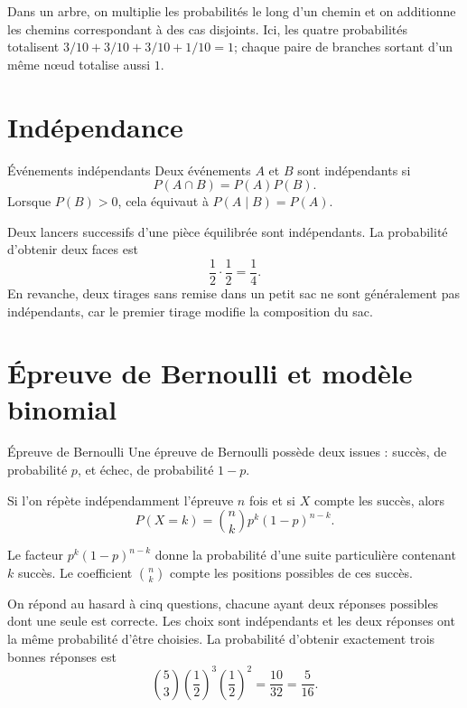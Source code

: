 Dans un arbre, on multiplie les probabilités le long d'un chemin et on additionne les chemins correspondant à des cas disjoints. Ici, les quatre probabilités totalisent \(3/10+3/10+3/10+1/10=1\); chaque paire de branches sortant d'un même nœud totalise aussi \(1\).

\section{Indépendance}
\label{manual:section:08.04}

\begin{definition}{Événements indépendants}{}
Deux événements $A$ et $B$ sont indépendants si
\[
P(A\cap B)=P(A)P(B).
\]
Lorsque $P(B)>0$, cela équivaut à $P(A\mid B)=P(A)$.
\end{definition}

\begin{examplebox}
Deux lancers successifs d'une pièce équilibrée sont indépendants. La probabilité d'obtenir deux faces est
\[
\frac12\cdot\frac12=\frac14.
\]
En revanche, deux tirages sans remise dans un petit sac ne sont généralement pas indépendants, car le premier tirage modifie la composition du sac.
\end{examplebox}

\section{Épreuve de Bernoulli et modèle binomial}
\label{manual:section:08.05}

\begin{definition}{Épreuve de Bernoulli}{}
Une épreuve de Bernoulli possède deux issues : succès, de probabilité $p$, et échec, de probabilité $1-p$.
\end{definition}

Si l'on répète indépendamment l'épreuve $n$ fois et si $X$ compte les succès, alors
\[
P(X=k)=\binom nk p^k(1-p)^{n-k}.
\]

\begin{intuitionbox}
Le facteur $p^k(1-p)^{n-k}$ donne la probabilité d'une suite particulière contenant $k$ succès. Le coefficient $\binom nk$ compte les positions possibles de ces succès.
\end{intuitionbox}

\begin{examplebox}
On répond au hasard à cinq questions, chacune ayant deux réponses possibles dont une seule est correcte. Les choix sont indépendants et les deux réponses ont la même probabilité d'être choisies. La probabilité d'obtenir exactement trois bonnes réponses est
\[
\binom53\left(\frac12\right)^3\left(\frac12\right)^2
=\frac{10}{32}=\frac5{16}.
\]
\end{examplebox}

